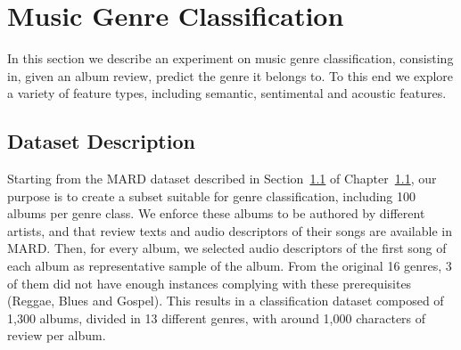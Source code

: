 



\section{Music Genre Classification}\label{sec:similarity:classification}

In this section we describe an experiment on music genre classification, consisting in, given an album review, predict the genre it belongs to. To this end we explore a variety of feature types, including semantic, sentimental and acoustic features. %

\subsection{Dataset Description}

Starting from the MARD dataset described in Section~\ref{} of Chapter~\ref{}, our purpose is to create a subset suitable for genre classification, including 100 albums per genre class. We enforce these albums to be authored by different artists, and that review texts and audio descriptors of their songs are available in MARD. Then, for every album, we selected audio descriptors of the first song of each album as representative sample of the album. From the original 16 genres, 3 of them did not have enough instances complying with these prerequisites (Reggae, Blues and Gospel). This results in a classification dataset composed of 1,300 albums, divided in 13 different genres, with around 1,000 characters of review per album.

